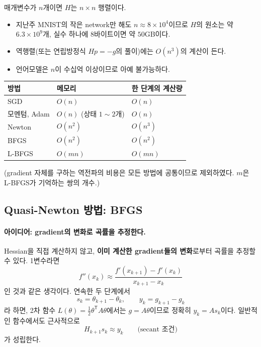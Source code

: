 \documentclass[11pt,a4paper]{article}
\newcommand{\T}{^{\mathsf T}}
\begin{document}
매개변수가 $n$개이면 $H$는 $n\times n$ 행렬이다.
\begin{itemize}[leftmargin=1.8em]
\item 지난주 MNIST의 작은 network만 해도 $n\approx8\times10^4$이므로 $H$의 원소는 약 $6.3\times10^9$개,
실수 하나에 8바이트이면 약 $50$GB이다.
\item 역행렬(또는 연립방정식 $Hp=-g$의 풀이)에는 $O(n^3)$의 계산이 든다.
\item 언어모델은 $n$이 수십억 이상이므로 아예 불가능하다.
\end{itemize}

\begin{center}
\begin{tabular}{@{}lll@{}}
\toprule
방법 & 메모리 & 한 단계의 계산량 \\
\midrule
SGD & $O(n)$ & $O(n)$ \\
모멘텀, Adam & $O(n)$ (상태 $1\sim2$개) & $O(n)$ \\
Newton & $O(n^2)$ & $O(n^3)$ \\
BFGS & $O(n^2)$ & $O(n^2)$ \\
L-BFGS & $O(mn)$ & $O(mn)$ \\
\bottomrule
\end{tabular}
\end{center}
(gradient 자체를 구하는 역전파의 비용은 모든 방법에 공통이므로 제외하였다. $m$은 L-BFGS가 기억하는 쌍의 개수.)

\subsection{Quasi-Newton 방법: BFGS}

\paragraph{아이디어: gradient의 변화로 곡률을 추정한다.}
Hessian을 직접 계산하지 않고, \textbf{이미 계산한 gradient들의 변화}로부터 곡률을 추정할 수 있다.
1변수라면
\[
f''(x_k)\approx\frac{f'(x_{k+1})-f'(x_k)}{x_{k+1}-x_k}
\]
인 것과 같은 생각이다.
연속한 두 단계에서
\[
s_k=\theta_{k+1}-\theta_k,
\qquad
y_k=g_{k+1}-g_k
\]
라 하면, 2차 함수 $L(\theta)=\frac12\theta\T A\theta$에서는 $g=A\theta$이므로 정확히 $y_k=As_k$이다.
일반적인 함수에서도 근사적으로
\[
\boxed{
H_{k+1}s_k\approx y_k
}
\qquad\text{(secant 조건)}
\]
가 성립한다.
\end{document}
